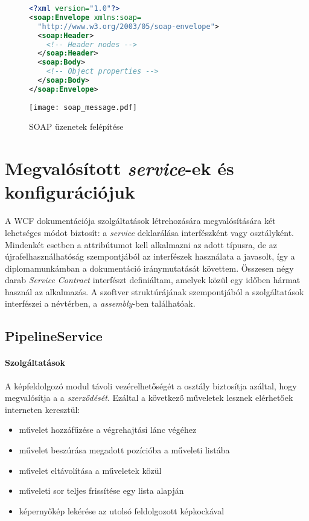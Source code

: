 \begin{figure}[h]
\centering
\begin{minipage}{0.73\textwidth}
\begin{mdframed}[backgroundcolor=gray!20]
\begin{scriptsize}
\begin{lstlisting}[language=XML]
<?xml version="1.0"?>
<soap:Envelope xmlns:soap=
  "http://www.w3.org/2003/05/soap-envelope">
  <soap:Header>
  	<!-- Header nodes -->
  </soap:Header>
  <soap:Body>
    <!-- Object properties -->
  </soap:Body>
</soap:Envelope>
\end{lstlisting}
\end{scriptsize}
\end{mdframed}
\end{minipage}
\hspace{0.5cm}
\begin{minipage}{0.21\textwidth}
\texttt{[image: soap\_message.pdf]}
\end{minipage}
\caption{SOAP üzenetek felépítése}
\end{figure}

\section{Megvalósított \emph{service}-ek és konfigurációjuk} \label{section:servicek}
A WCF dokumentációja szolgáltatások létrehozására megvalósítására két lehetséges módot biztosít: a \emph{service} deklarálása interfészként vagy osztályként. Mindenkét esetben a \code{[ServiceContract]} attribútumot kell alkalmazni az adott típusra, de az újrafelhasználhatóság szempontjából az interfészek használata a javasolt, így a diplomamunkámban a dokumentáció iránymutatását követtem. Összesen négy darab \emph{Service Contract} interfészt definiáltam, amelyek közül egy időben hármat használ az alkalmazás. A szoftver struktúrájának szempontjából a szolgáltatások interfészei a  névtérben, a  \emph{assembly}-ben találhatóak.
\subsection{PipelineService}

\paragraph{Szolgáltatások}
A képfeldolgozó modul távoli vezérelhetőségét a  osztály biztosítja azáltal, hogy megvalósítja a a  \textit{szerződését}. Ezáltal a következő műveletek lesznek elérhetőek interneten keresztül:
\begin{itemize}
\item művelet hozzáfűzése a végrehajtási lánc végéhez
\item művelet beszúrása megadott pozícióba a műveleti listába
\item művelet eltávolítása a műveletek közül
\item műveleti sor teljes frissítése egy lista alapján
\item képernyőkép lekérése az utolsó feldolgozott képkockával
\end{itemize}

